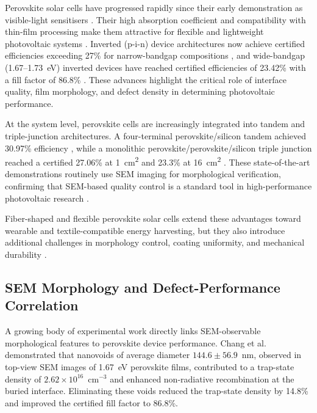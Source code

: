 \documentclass[pdflatex,sn-mathphys-num,iicol]{sn-jnl}
\theoremstyle{thmstyleone}
\theoremstyle{thmstyletwo}
\theoremstyle{thmstylethree}
\begin{document}
Perovskite solar cells have progressed rapidly since their early
demonstration as visible-light sensitisers \cite{kojima2009}. Their
high absorption coefficient and compatibility with thin-film
processing make them attractive for flexible and lightweight
photovoltaic systems \cite{snaith2013,green2014,park2015}. Inverted
(p-i-n) device architectures now achieve certified efficiencies
exceeding 27\% for narrow-bandgap compositions \cite{green2025},
and wide-bandgap (1.67--1.73~eV) inverted devices have reached
certified efficiencies of 23.42\% with a fill factor of 86.8\%
\cite{chang2026}. These advances highlight the critical role of
interface quality, film morphology, and defect density in determining
photovoltaic performance.

At the system level, perovskite cells are increasingly integrated
into tandem and triple-junction architectures. A four-terminal
perovskite/silicon tandem achieved 30.97\% efficiency
\cite{chang2026}, while a monolithic perovskite/perovskite/silicon
triple junction reached a certified 27.06\% at 1~cm\textsuperscript{2}
and 23.3\% at 16~cm\textsuperscript{2} \cite{zheng2025}. These
state-of-the-art demonstrations routinely use SEM imaging for
morphological verification, confirming that SEM-based quality control
is a standard tool in high-performance photovoltaic research
\cite{chang2026,zheng2025}.

Fiber-shaped and flexible perovskite solar cells extend these
advantages toward wearable and textile-compatible energy harvesting,
but they also introduce additional challenges in morphology control,
coating uniformity, and mechanical durability
\cite{balilonda2019,hu2016,qiu2016,diGiacomo2016}.

\subsection{SEM Morphology and Defect-Performance Correlation}
\label{subsec:sem_morphology_correlation}

A growing body of experimental work directly links SEM-observable
morphological features to perovskite device performance. Chang et al.\
\cite{chang2026} demonstrated that nanovoids of average diameter
$144.6 \pm 56.9$~nm, observed in top-view SEM images of 1.67~eV
perovskite films, contributed to a trap-state density of
$2.62 \times 10^{16}$~cm$^{-3}$ and enhanced non-radiative
recombination at the buried interface. Eliminating these voids
reduced the trap-state density by 14.8\% and improved the certified
fill factor to 86.8\%.
\end{document}
